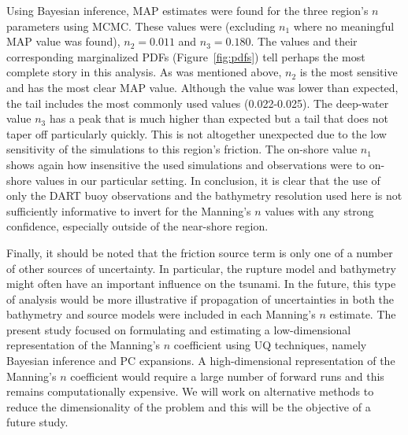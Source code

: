 Using Bayesian inference, MAP estimates were found for the three region's $n$
parameters using MCMC.  These values were (excluding $n_1$ where no meaningful
MAP value was found), $n_2=0.011$ and $n_3=0.180$.  The values and their
corresponding marginalized PDFs (Figure~\ref{fig:pdfs}) tell perhaps the most
complete story in this analysis.  As was mentioned above, $n_2$ is the most
sensitive and has the most clear MAP value.  Although the value was lower than
expected, the tail includes the most commonly used values (0.022-0.025).  The
deep-water value $n_3$ has a peak that is much higher than expected but a tail
that does not taper off particularly quickly.  This is not altogether unexpected
due to the low sensitivity of the simulations to this region's friction.  The
on-shore value $n_1$ shows again how insensitive the used simulations and
observations were to on-shore values in our particular setting.  
In conclusion, it is clear that the use of only the DART buoy observations and the 
bathymetry resolution used here is not sufficiently informative to invert for the 
Manning's $n$ values with any strong confidence, especially outside of the near-shore region.

Finally, it should be noted that the friction source term is only one of a
number of other sources of uncertainty.  In particular, the rupture model and
bathymetry might often have an important influence on the tsunami.  
In the future, this type of analysis would be more illustrative if
propagation of uncertainties in both the bathymetry and source models were
included in each Manning's $n$ estimate.  The
present study focused on formulating and estimating a low-dimensional
representation of the Manning's $n$ coefficient using UQ techniques, namely
Bayesian inference and PC expansions.  A high-dimensional representation of the
Manning's $n$ coefficient would require a large number of forward runs and this remains
computationally expensive.  We will work on alternative methods to reduce the
dimensionality of the problem and this will be the objective of a future study.
